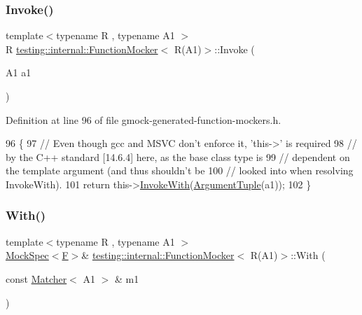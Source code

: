 \subsubsection{\texorpdfstring{Invoke()}{Invoke()}}
{\footnotesize\ttfamily template$<$typename R , typename A1 $>$ \\
R \hyperlink{classtesting_1_1internal_1_1FunctionMocker}{testing\+::internal\+::\+Function\+Mocker}$<$ R(A1)$>$\+::Invoke (\begin{DoxyParamCaption}\item[{A1}]{a1 }\end{DoxyParamCaption})\hspace{0.3cm}{\ttfamily [inline]}}



Definition at line 96 of file gmock-\/generated-\/function-\/mockers.\+h.


\begin{DoxyCode}
96                   \{
97     \textcolor{comment}{// Even though gcc and MSVC don't enforce it, 'this->' is required}
98     \textcolor{comment}{// by the C++ standard [14.6.4] here, as the base class type is}
99     \textcolor{comment}{// dependent on the template argument (and thus shouldn't be}
100     \textcolor{comment}{// looked into when resolving InvokeWith).}
101     \textcolor{keywordflow}{return} this->\hyperlink{classtesting_1_1internal_1_1FunctionMockerBase_a869ec713f000b4e7829c660efc25e8cd}{InvokeWith}(\hyperlink{classtesting_1_1internal_1_1FunctionMocker_3_01R_07A1_08_4_aacec6412ac4343c071d7dfe965558b0b}{ArgumentTuple}(a1));
102   \}
\end{DoxyCode}
\mbox{\label{classtesting_1_1internal_1_1FunctionMocker_3_01R_07A1_08_4_aa61b5c24c52b8c49713774c49a01b26e}} 
\subsubsection{\texorpdfstring{With()}{With()}}
{\footnotesize\ttfamily template$<$typename R , typename A1 $>$ \\
\hyperlink{classtesting_1_1internal_1_1MockSpec}{Mock\+Spec}$<$\hyperlink{classtesting_1_1internal_1_1FunctionMocker_3_01R_07A1_08_4_ada54286442ab14a18c2308cef748848f}{F}$>$\& \hyperlink{classtesting_1_1internal_1_1FunctionMocker}{testing\+::internal\+::\+Function\+Mocker}$<$ R(A1)$>$\+::With (\begin{DoxyParamCaption}\item[{const \hyperlink{classtesting_1_1Matcher}{Matcher}$<$ A1 $>$ \&}]{m1 }\end{DoxyParamCaption})\hspace{0.3cm}{\ttfamily [inline]}}



